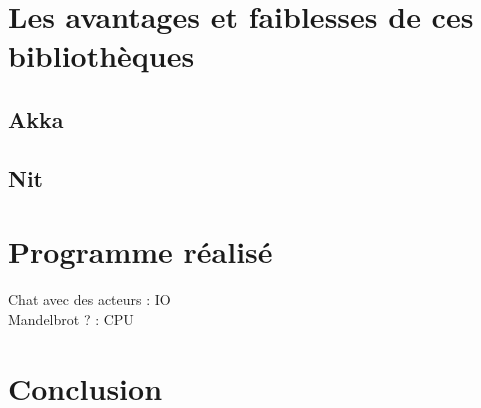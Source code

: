 \documentclass[11pt, a4paper]{article}
\begin{document}
\section{Les avantages et faiblesses de ces bibliothèques}

\subsection{Akka}

\subsection{Nit}


\section{Programme réalisé}
Chat avec des acteurs  : IO\\
Mandelbrot ? : CPU\\

\section{Conclusion}


\end{document}
